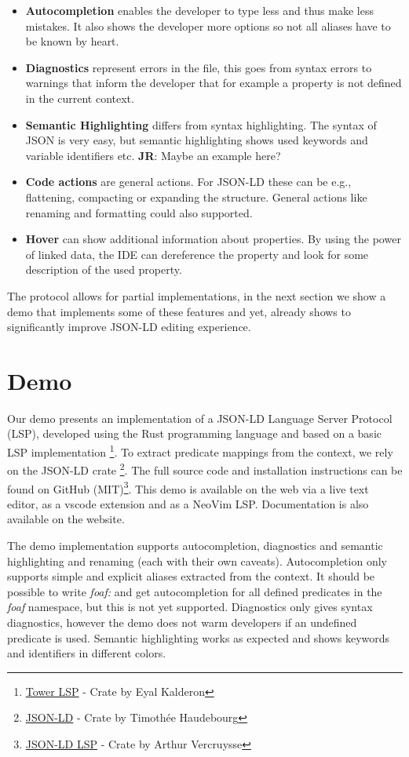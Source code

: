 \documentclass[
]{ceurart}
\newcommand\jr[1]{{\color{Red}\textbf{JR}: #1}}
\begin{document}
\begin{itemize}
  \item \textbf{Autocompletion} enables the developer to type less and thus make less mistakes. It also shows the developer more options so not all aliases have to be known by heart.
  \item \textbf{Diagnostics} represent errors in the file, this goes from syntax errors to warnings that inform the developer that for example a property is not defined in the current context.
  \item \textbf{Semantic Highlighting} differs from syntax highlighting. The syntax of JSON is very easy, but semantic highlighting shows used keywords and variable identifiers etc. \jr{Maybe an example here?}
  \item \textbf{Code actions} are general actions. For JSON-LD these can be e.g., flattening, compacting or expanding the structure. General actions like renaming and formatting could also supported.
  \item \textbf{Hover} can show additional information about properties. By using the power of linked data, the IDE can dereference the property and look for some description of the used property.
\end{itemize}

The protocol allows for partial implementations, in the next section we show a demo that implements some of these features and yet, already shows to significantly improve JSON-LD editing experience.

\section{Demo}

Our demo presents an implementation of a JSON-LD Language Server Protocol (LSP), developed using the Rust programming language and based on a basic LSP implementation \footnote{\href{https://crates.io/crates/tower-lsp}{Tower LSP} - Crate by Eyal Kalderon}.
To extract predicate mappings from the context, we rely on the JSON-LD crate \footnote{\href{https://crates.io/crates/json-ld}{JSON-LD} - Crate by Timothée Haudebourg}.
The full source code and installation instructions can be found on GitHub (MIT)\footnote{\href{https://github.com/ajuvercr/jsonld-lsp}{JSON-LD LSP} - Crate by Arthur Vercruysse}.
This demo is available on the web via a live text editor, as a vscode extension and as a NeoVim LSP. Documentation is also available on the website. 

The demo implementation supports autocompletion, diagnostics and semantic highlighting and renaming (each with their own caveats). 
Autocompletion only supports simple and explicit aliases extracted from the context. 
It should be possible to write \textit{foaf:} and get autocompletion for all defined predicates in the \textit{foaf} namespace, but this is not yet supported.
Diagnostics only gives syntax diagnostics, however the demo does not warm developers if an undefined predicate is used.
Semantic highlighting works as expected and shows keywords and identifiers in different colors.
\end{document}
